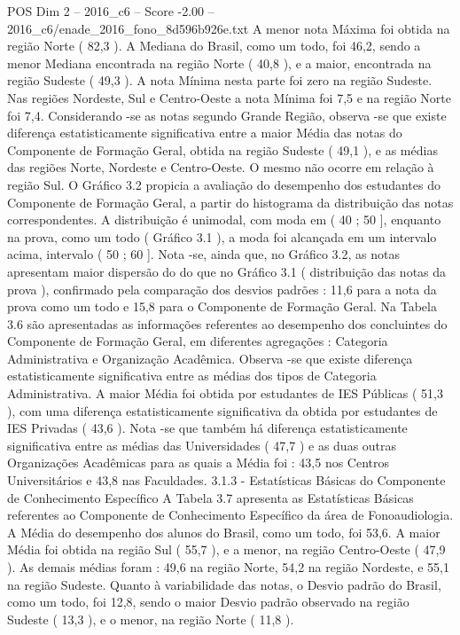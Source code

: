 \begin{textsample}{POS Dim 2 – 2016\_c6 – Score -2.00 – 2016\_c6/enade\_2016\_fono\_8d596b926e.txt}
A menor nota Máxima foi obtida na região Norte ( 82,3 ).
A Mediana do Brasil, como um todo, foi 46,2, sendo a menor Mediana encontrada na região Norte ( 40,8 ), e a maior, encontrada na região Sudeste ( 49,3 ).
A nota Mínima nesta parte foi zero na região Sudeste.
Nas regiões Nordeste, Sul e Centro-Oeste a nota Mínima foi 7,5 e na região Norte foi 7,4.
Considerando -se as notas segundo Grande Região, observa -se que existe diferença estatisticamente significativa entre a maior Média das notas do Componente de Formação Geral, obtida na região Sudeste ( 49,1 ), e as médias das regiões Norte, Nordeste e Centro-Oeste.
O mesmo não ocorre em relação à região Sul.
O Gráfico 3.2 propicia a avaliação do desempenho dos estudantes do Componente de Formação Geral, a partir do histograma da distribuição das notas correspondentes.
A distribuição é unimodal, com moda em ( 40 ; 50 ], enquanto na prova, como um todo ( Gráfico 3.1 ), a moda foi alcançada em um intervalo acima, intervalo ( 50 ; 60 ].
Nota -se, ainda que, no Gráfico 3.2, as notas apresentam maior dispersão do do que no Gráfico 3.1 ( distribuição das notas da prova ), confirmado pela comparação dos desvios padrões : 11,6 para a nota da prova como um todo e 15,8 para o Componente de Formação Geral.
Na Tabela 3.6 são apresentadas as informações referentes ao desempenho dos concluintes do Componente de Formação Geral, em diferentes agregações : Categoria Administrativa e Organização Acadêmica.
Observa -se que existe diferença estatisticamente significativa entre as médias dos tipos de Categoria Administrativa.
A maior Média foi obtida por estudantes de IES Públicas ( 51,3 ), com uma diferença estatisticamente significativa da obtida por estudantes de IES Privadas ( 43,6 ).
Nota -se que também há diferença estatisticamente significativa entre as médias das Universidades ( 47,7 ) e as duas outras Organizações Acadêmicas para as quais a Média foi : 43,5 nos Centros Universitários e 43,8 nas Faculdades. 3.1.3 - Estatísticas Básicas do Componente de Conhecimento Específico A Tabela 3.7 apresenta as Estatísticas Básicas referentes ao Componente de Conhecimento Específico da área de Fonoaudiologia.
A Média do desempenho dos alunos do Brasil, como um todo, foi 53,6.
A maior Média foi obtida na região Sul ( 55,7 ), e a menor, na região Centro-Oeste ( 47,9 ).
As demais médias foram : 49,6 na região Norte, 54,2 na região Nordeste, e 55,1 na região Sudeste.
Quanto à variabilidade das notas, o Desvio padrão do Brasil, como um todo, foi 12,8, sendo o maior Desvio padrão observado na região Sudeste ( 13,3 ), e o menor, na região Norte ( 11,8 ).

\end{textsample}
